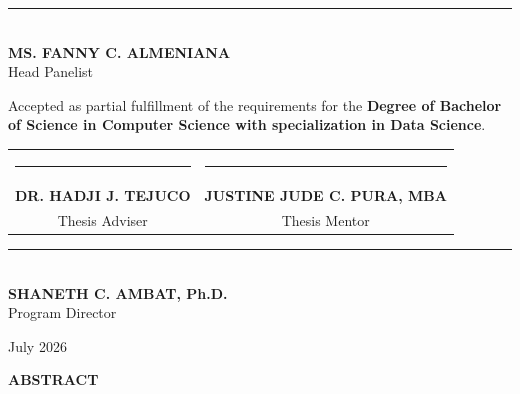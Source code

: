 \documentclass[12pt, letterpaper]{article}
\numberwithin{figure}{section}
\numberwithin{table}{section}
\begin{document}
\begin{center}
  \vspace{1cm}

  \rule{6cm}{0.4pt} \\
  \textbf{MS. FANNY C. ALMENIANA} \\
  Head Panelist

  \vspace{1cm}

  \begin{minipage}{1\textwidth}
    \justifying
    Accepted as partial fulfillment of the requirements for the
    \textbf{Degree of Bachelor of Science in Computer Science with
    specialization in Data Science}.
  \end{minipage}

  \vspace{1cm}

  \begin{tabular}{cc}
    \rule{6cm}{0.4pt} & \hspace{1cm} \rule{6cm}{0.4pt} \\
    \textbf{DR. HADJI J. TEJUCO} & \hspace{1cm} \textbf{JUSTINE JUDE
    C. PURA, MBA} \\
    Thesis Adviser & \hspace{1cm} Thesis Mentor \\
  \end{tabular}

  \vspace{1.5cm}

  \rule{6cm}{0.4pt} \\
  \textbf{SHANETH C. AMBAT, Ph.D.} \\
  Program Director

  \vfill

  July 2026

\end{center}

\newpage
\begin{center}
  \textbf{ABSTRACT}
\end{center}

\vspace{1cm}
\end{document}
